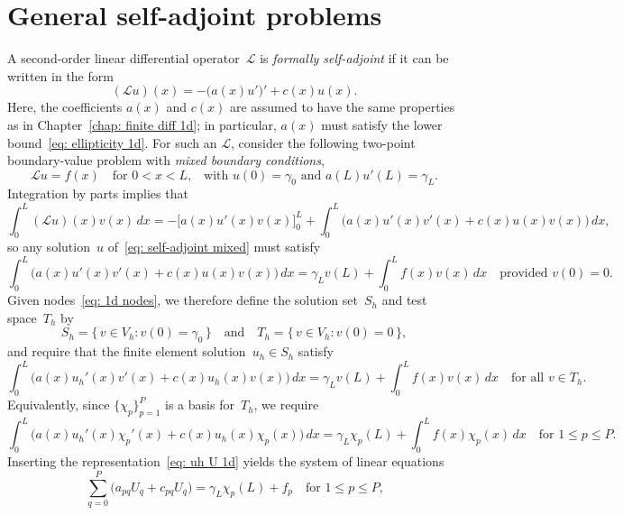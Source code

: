 \section{General self-adjoint problems}\label{sec: self-adjoint 1d}
A second-order linear differential operator~$\mathcal{L}$ is 
\emph{formally self-adjoint} if it can be written in the form
\begin{equation}\label{eq: L self-adjoint}
(\mathcal{L}u)(x)=-\bigl(a(x)u'\bigr)'+c(x)u(x).
\end{equation}
Here, the coefficients $a(x)$ and $c(x)$ are assumed to have the same 
properties as in Chapter~\ref{chap: finite diff 1d}; in particular, $a(x)$ must 
satisfy the lower bound~\eqref{eq: ellipticity 1d}. For such an $\mathcal{L}$, 
consider the following two-point boundary-value problem with \emph{mixed 
boundary conditions},
\begin{equation}\label{eq: self-adjoint mixed}
\mathcal{L}u=f(x)\quad\text{for $0<x<L$,}\quad
\text{with $u(0)=\gamma_0$ and $a(L)u'(L)=\gamma_L$.}
\end{equation}
Integration by parts implies that
\begin{equation}\label{eq: Lu v by parts}
\int_0^L(\mathcal{L}u)(x)v(x)\,dx
    =-\bigl[a(x)u'(x)v(x)\bigr]_0^L+\int_0^L\bigl(a(x)u'(x)v'(x)+c(x)u(x)v(x)
        \bigr)\,dx,
\end{equation}
so any solution~$u$ of~\eqref{eq: self-adjoint mixed} must satisfy
\begin{equation}\label{eq: Lu=f weak 1d}
\int_0^L\bigl(a(x)u'(x)v'(x)+c(x)u(x)v(x)\bigr)\,dx
    =\gamma_Lv(L)+\int_0^Lf(x)v(x)\,dx
    \quad\text{provided $v(0)=0$.}
\end{equation}
Given nodes~\eqref{eq: 1d nodes}, we therefore define the solution set~$S_h$ and 
test space~$T_h$ by
\[
S_h=\{\,v\in V_h:v(0)=\gamma_0\,\}
\quad\text{and}\quad
T_h=\{\,v\in V_h:v(0)=0\,\},
\]
and require that the finite element solution~$u_h\in S_h$ satisfy
\begin{equation}\label{eq: self-adjoint mixed bc FEM}
\int_0^L\bigl(a(x)u_h'(x)v'(x)+c(x)u_h(x)v(x)\bigr)\,dx
    =\gamma_Lv(L)+\int_0^Lf(x)v(x)\,dx
    \quad\text{for all $v\in T_h$.}
\end{equation}
Equivalently, since $\{\chi_p\}_{p=1}^P$ is a basis for~$T_h$, we require
\[
\int_0^L\bigl(a(x)u_h'(x)\chi_p'(x)+c(x)u_h(x)\chi_p(x)\bigr)\,dx
    =\gamma_L\chi_p(L)+\int_0^Lf(x)\chi_p(x)\,dx
    \quad\text{for $1\le p\le P$.}
\]
Inserting the representation~\eqref{eq: uh U 1d} yields the system of linear 
equations
\[
\sum_{q=0}^P\bigl(a_{pq}U_q+c_{pq}U_q\bigr)=\gamma_L\chi_p(L)+f_p
    \quad\text{for $1\le p\le P$,}
\]
